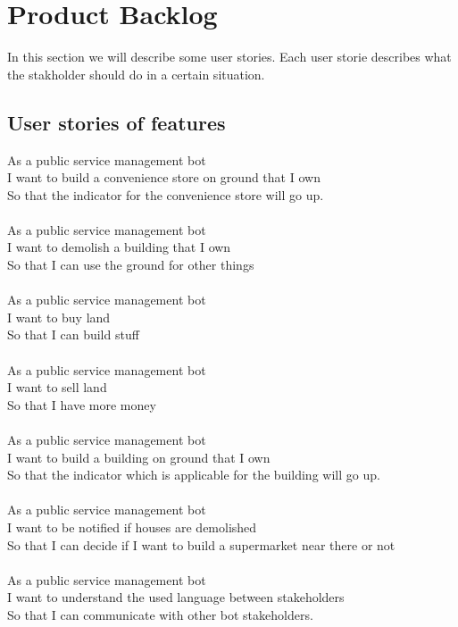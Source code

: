 \section{Product Backlog}
In this section we will describe some user stories. Each user storie describes what the stakholder should do in a certain situation.
\subsection{User stories of features}

As a public service management bot\\
I want to build a convenience store on ground that I own\\
So that the indicator for the convenience store will go up.\\
\\
As a public service management bot\\
I want to demolish a building that I own\\
So that I can use the ground for other things\\
\\
As a public service management bot\\
I want to buy land\\
So that I can build stuff\\
\\
As a public service management bot\\
I want to sell land\\
So that I have more money\\
\\
As a public service management bot\\
I want to build a building on ground that I own\\
So that the indicator which is applicable for the building will go up.\\
\\
As a public service management bot\\
I want to be notified if houses are demolished\\
So that I can decide if I want to build a supermarket near there or not\\
\\
As a public service management bot\\
I want to understand the used language between stakeholders\\
So that I can communicate with other bot stakeholders.\\
\\

